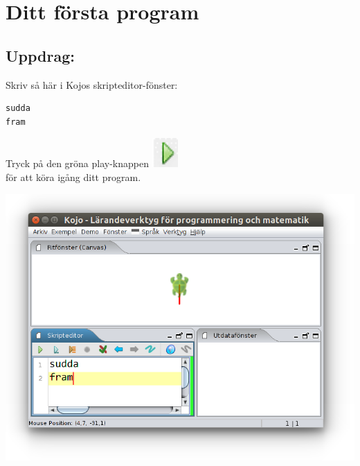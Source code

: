 \chapter{Ditt första program}
\begin{multicols}{2}
\section*{\color{BrickRed}Uppdrag:}
Skriv så här i Kojos skripteditor-fönster:

\begin{lstlisting}[basicstyle={\ttfamily\fontsize{48.0}{48.0}\selectfont}]
sudda
fram
\end{lstlisting}
        
Tryck på den gröna play-knappen 
\includegraphics[width=1.0cm]{../img/play.png}
\\

för att köra igång ditt program.

\columnbreak

\begin{center}
\includegraphics[width=14.0cm]{../img/fram.png}
\end{center}

\end{multicols}

